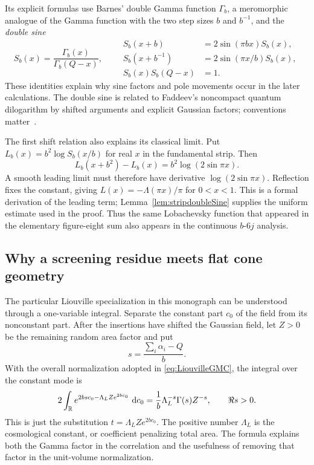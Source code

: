 Its explicit formulas use Barnes' double Gamma function $\Gamma_b$,
a meromorphic analogue of the Gamma function with the two step
sizes $b$ and $b^{-1}$, and the \emph{double sine}
\begin{equation}
 S_b(x)=\frac{\Gamma_b(x)}{\Gamma_b(Q-x)},\qquad
 \begin{aligned}
 S_b(x+b)&=2\sin(\pi bx)S_b(x),\\
 S_b(x+b^{-1})&=2\sin(\pi x/b)S_b(x),\\
 S_b(x)S_b(Q-x)&=1.
 \end{aligned}
 \label{eq:introdoublesine}
\end{equation}
These identities explain why sine factors and pole movements occur
in the later calculations. The double sine is related to Faddeev's
noncompact quantum dilogarithm by shifted arguments and explicit
Gaussian factors; conventions matter~\cite[Appendix A]{TeschnerVartanov}.

The first shift relation also explains its classical limit. Put
$L_b(x)=b^2\log S_b(x/b)$ for real $x$ in the fundamental strip.
Then
\[
 L_b(x+b^2)-L_b(x)=b^2\log(2\sin\pi x).
\]
A smooth leading limit must therefore have derivative
$\log(2\sin\pi x)$. Reflection fixes the constant, giving
$L(x)=-\Lambda(\pi x)/\pi$ for $0<x<1$. This is a formal
derivation of the leading term; Lemma~\ref{lem:stripdoubleSine}
supplies the uniform estimate used in the proof. Thus the same
Lobachevsky function that appeared in the elementary figure-eight
sum also appears in the continuous $b$-$6j$ analysis.

\subsection{Why a screening residue meets flat cone geometry}
\label{sec:introscreening}

The particular Liouville specialization in this monograph can be
understood through a one-variable integral. Separate the constant
part $c_0$ of the field from its nonconstant part. After the
insertions have shifted the Gaussian field, let $Z>0$ be the
remaining random area factor and put
\[
 s=\frac{\sum_i\alpha_i-Q}{b}.
\]
With the overall normalization adopted in
\eqref{eq:LiouvilleGMC}, the integral over the constant mode is
\begin{equation}
 2\int_{\mathbb R}e^{2bs c_0-\Lambda_L Z e^{2bc_0}}\,\mathop{}\!\mathrm d c_0
 =\frac1b\Lambda_L^{-s}\Gamma(s)Z^{-s},\qquad \Re s>0.
 \label{eq:introzeromode}
\end{equation}
This is just the substitution $t=\Lambda_L Z e^{2bc_0}$. The
positive number $\Lambda_L$ is the cosmological constant, or
coefficient penalizing total area. The formula explains both the
Gamma factor in the correlation and the usefulness of removing
that factor in the unit-volume normalization.

